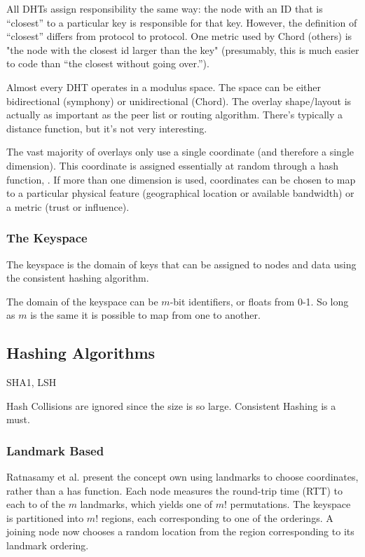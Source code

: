 \documentclass[10pt,letterpaper]{report}
\begin{document}
All DHTs assign responsibility the same way:  the node with an ID that is ``closest'' to a particular key is responsible for that key.  
However, the definition of ``closest'' differs from protocol to protocol.
One metric used by Chord (others) is "the node with the closest id larger than the key" (presumably, this is much easier to code than ``the closest without going over.'').


Almost every DHT operates in a modulus space.  The space can be either bidirectional (symphony) or unidirectional (Chord).
The overlay shape/layout is actually as important as the peer list or routing algorithm.
There's typically a distance function, but it's not very interesting.

The vast majority of overlays only use a single coordinate (and therefore a single dimension).  
This coordinate is assigned essentially at random through a hash function, .  
If more than one dimension is used, coordinates can be chosen to map to a particular physical feature (geographical location  or available bandwidth) or a metric (trust or influence).

\subsubsection{The Keyspace}
The keyspace is the domain of keys that can be assigned to nodes and data using the  consistent hashing algorithm.  

The domain of the keyspace can be $m$-bit identifiers, or floats from 0-1.  So long as $m$ is the same it is possible to map from one to another.

\subsection{Hashing Algorithms}
SHA1, LSH

Hash Collisions are ignored since the size is so large.
Consistent Hashing is a must.

\subsubsection{Landmark Based}
Ratnasamy et al. \cite{can} present the concept own using landmarks to choose coordinates, rather than a has function.
Each node measures the round-trip time (RTT) to each to of the $m$ landmarks, which yields one of $m!$ permutations.
The keyspace is partitioned into $m!$ regions, each corresponding to one of the orderings.  
A joining node now chooses a random location from the region corresponding to its landmark ordering.
\end{document}
